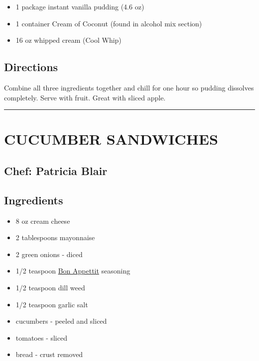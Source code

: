 \documentclass[
]{book}
\providecommand{\tightlist}{%
  \setlength{\itemsep}{0pt}\setlength{\parskip}{0pt}}
\begin{document}
\begin{itemize}
\tightlist
\item
  1 package instant vanilla pudding (4.6 oz)
\item
  1 container Cream of Coconut (found in alcohol mix section)
\item
  16 oz whipped cream (Cool Whip)
\end{itemize}

\hypertarget{directions-2}{%
\subsection*{Directions}\label{directions-2}}


Combine all three ingredients together and chill for one hour so pudding dissolves completely. Serve with fruit. Great with sliced apple.

\begin{center}\rule{0.5\linewidth}{0.5pt}\end{center}

\hypertarget{cucumber-sandwiches}{%
\section*{CUCUMBER SANDWICHES}\label{cucumber-sandwiches}}


\hypertarget{chef-patricia-blair-1}{%
\subsection*{Chef: Patricia Blair}\label{chef-patricia-blair-1}}


\hypertarget{ingredients-3}{%
\subsection*{Ingredients}\label{ingredients-3}}


\begin{itemize}
\tightlist
\item
  8 oz cream cheese
\item
  2 tablespoons mayonnaise
\item
  2 green onions - diced
\item
  1/2 teaspoon \href{https://www.mccormick.com/gourmet/recipes/other/bon-appetit-seasoning-replacement}{Bon Appettit} seasoning
\item
  1/2 teaspoon dill weed
\item
  1/2 teaspoon garlic salt
\item
  cucumbers - peeled and sliced
\item
  tomatoes - sliced
\item
  bread - crust removed
\end{itemize}
\end{document}
